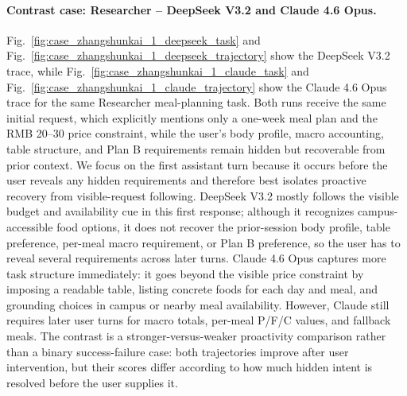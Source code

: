 \documentclass{llmxive}
\providecommand{\caseZhangshunkaiOneTag}[3]{    {\setlength{\fboxsep}{1.6pt}\colorbox{#1}{\scriptsize\textbf{#3}}}}
\providecommand{\caseZhangshunkaiOneLine}[3]{    \caseZhangshunkaiOneTag{#1}{#2}{#3}\hspace{3pt}}
\providecommand{\caseZhangshunkaiOneIO}[3]{    \vspace{2pt}
    \noindent\caseZhangshunkaiOneLine{#1}{white}{#2}\textbf{#3}
}
\providecommand{\caseZhangshunkaiOneNote}[1]{    \vspace{2pt}
    \noindent{\scriptsize\textit{#1}}
}
\begin{document}
\paragraph{Contrast case: Researcher -- DeepSeek V3.2 and Claude 4.6 Opus.}
Fig.~\ref{fig:case_zhangshunkai_1_deepseek_task} and Fig.~\ref{fig:case_zhangshunkai_1_deepseek_trajectory} show the DeepSeek V3.2 trace, while Fig.~\ref{fig:case_zhangshunkai_1_claude_task} and Fig.~\ref{fig:case_zhangshunkai_1_claude_trajectory} show the Claude 4.6 Opus trace for the same Researcher meal-planning task.
Both runs receive the same initial request, which explicitly mentions only a one-week meal plan and the RMB 20--30 price constraint, while the user's body profile, macro accounting, table structure, and Plan B requirements remain hidden but recoverable from prior context.
We focus on the first assistant turn because it occurs before the user reveals any hidden requirements and therefore best isolates proactive recovery from visible-request following.
DeepSeek V3.2 mostly follows the visible budget and availability cue in this first response; although it recognizes campus-accessible food options, it does not recover the prior-session body profile, table preference, per-meal macro requirement, or Plan B preference, so the user has to reveal several requirements across later turns.
Claude 4.6 Opus captures more task structure immediately: it goes beyond the visible price constraint by imposing a readable table, listing concrete foods for each day and meal, and grounding choices in campus or nearby meal availability.
However, Claude still requires later user turns for macro totals, per-meal P/F/C values, and fallback meals.
The contrast is a stronger-versus-weaker proactivity comparison rather than a binary success-failure case: both trajectories improve after user intervention, but their scores differ according to how much hidden intent is resolved before the user supplies it.

\providecommand{\caseZhangshunkaiOneTag}[3]{%
    {\setlength{\fboxsep}{1.6pt}\colorbox{#1}{\scriptsize\textbf{#3}}}%
}
\providecommand{\caseZhangshunkaiOneLine}[3]{%
    \caseZhangshunkaiOneTag{#1}{#2}{#3}\hspace{3pt}%
}
\providecommand{\caseZhangshunkaiOneIO}[3]{%
    \vspace{2pt}
    \noindent\caseZhangshunkaiOneLine{#1}{white}{#2}\textbf{#3}
}
\providecommand{\caseZhangshunkaiOneNote}[1]{%
    \vspace{2pt}
    \noindent{\scriptsize\textit{#1}}
}
\end{document}

